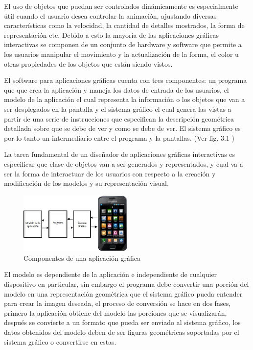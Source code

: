 \documentclass[12pt,a4paper,spanish,openany]{book}
\begin{document}
El uso de objetos que puedan ser controlados dinámicamente es especialmente útil
cuando el usuario desea controlar la animación, ajustando diversas características como la velocidad, la
cantidad de detalles mostrados, la forma de representación etc. Debido a esto la
mayoría de las aplicaciones gráficas interactivas se componen de un conjunto de
\gls{hardware} y \gls{software} que permite a los usuarios manipular el
movimiento y la actualización de la forma, el color u otras propiedades de los
objetos que están siendo vistos.

El software para aplicaciones gráficas cuenta con tres componentes: un
programa que que crea la aplicación y maneja los datos de entrada de los
usuarios, el modelo de la aplicación el cual representa la información o los
objetos que van a ser desplegados en la pantalla y el sistema gráfico el cual
genera las vistas a partir de una serie de instrucciones que especifican la
descripción geométrica detallada sobre que se debe de ver y como se debe de ver.
El sistema gráfico es por lo tanto un intermediario entre el programa y la
pantallas. (Ver fig. 3.1 )

La tarea fundamental de un diseñador de aplicaciones gráficas interactivas es
especificar que clase de objetos van a ser generados y representados, y cual va
a ser la forma de interactuar de los usuarios con respecto a la creación y
modificación de los modelos y su representación visual.

\begin{figure}
\begin{center}
\includegraphics[width=0.5\textwidth]{./img/sistGra.jpg}
\caption{Componentes de una aplicación gráfica}
\end{center}
\end{figure}

El modelo es dependiente de la aplicación e independiente de cualquier
dispositivo en particular, sin embargo el programa debe convertir una porción
del modelo en una representación geométrica que el sistema gráfico pueda
entender para crear la imagen deseada, el proceso de conversión se hace en dos
fases, primero la aplicación obtiene del modelo las porciones que se
visualizarán, después se convierte a un formato que pueda ser enviado al sistema
gráfico, los datos obtenidos del modelo deben de ser figuras geométricas
soportadas por el sistema gráfico o convertirse en estas.
\end{document}
